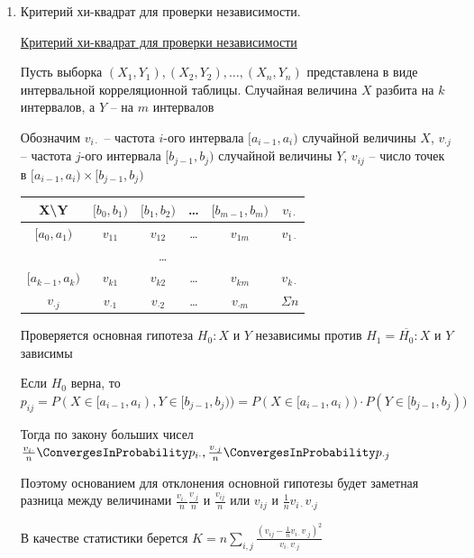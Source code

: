 \begin{enumerate}
    \item Критерий хи-квадрат для проверки независимости.

    \hyperlink{chi_square_independence_criterion}{Критерий хи-квадрат для проверки независимости}
    
    Пусть выборка $(X_1, Y_1), (X_2, Y_2), \dots, (X_n, Y_n)$ представлена в виде интервальной корреляционной таблицы. Случайная величина $X$ 
    разбита на $k$ интервалов, а $Y$ -- на $m$ интервалов

    Обозначим $v_{i\cdot}$ -- частота $i$-ого интервала $[a_{i - 1}, a_i)$ случайной величины $X$, 
    $v_{\cdot j}$ -- частота $j$-ого интервала $[b_{j - 1}, b_j)$ случайной величины $Y$, $v_{ij}$ -- число точек в $[a_{i - 1}, a_i) \times [b_{j - 1}, b_j)$


    \begin{tabular}{c|c|c|c|c|c}
        X\backslash Y & $[b_0, b_1)$ & $[b_1, b_2)$ & \dots & $[b_{m - 1}, b_m)$ & $v_{i\cdot}$ \\
        \hline
        $[a_0, a_1)$ & $v_{11}$ & $v_{12}$ & \dots & $v_{1m}$ & $v_{1\cdot}$ \\
        \hline
        \multicolumn{6}{c}{\dots} \\
        \hline
        $[a_{k - 1}, a_k)$ & $v_{k1}$ & $v_{k2}$ & \dots & $v_{km}$ & $v_{k\cdot}$ \\
        \hline
        $v_{\cdot j}$ & $v_{\cdot 1}$ & $v_{\cdot 2}$ & \dots & $v_{\cdot m}$ & $\Sigma n$ \\
    \end{tabular}

    Проверяется основная гипотеза $H_0 : X \text{ и } Y$ независимы против $H_1 = \overline{H_0} : X \text{ и } Y$ зависимы

    Если $H_0$ верна, то $p_{ij} = P(X \in [a_{i - 1}, a_i), Y \in [b_{j - 1}, b_j)) = P(X \in [a_{i - 1}, a_i)) \cdot P(Y \in [b_{j - 1}, b_j))$

    Тогда по закону больших чисел $\frac{v_{i\cdot}}{n} \ConvergesInProbability p_{i\cdot}, \frac{v_{\cdot j}}{n} \ConvergesInProbability p_{\cdot j}$

    Поэтому основанием для отклонения основной гипотезы будет заметная разница между величинами $\frac{v_{i\cdot}}{n}\frac{v_{\cdot j}}{n}$ и 
    $\frac{v_{ij}}{n}$ или $v_{ij}$ и $\frac{1}{n} v_{i\cdot} v_{\cdot j}$

    В качестве статистики берется $K = n \sum_{i, j} \frac{\left(v_{ij} - \frac{1}{n} v_{i\cdot} v_{\cdot j}\right)^2}{v_{i\cdot} v_{\cdot j}}$


\end{enumerate}
